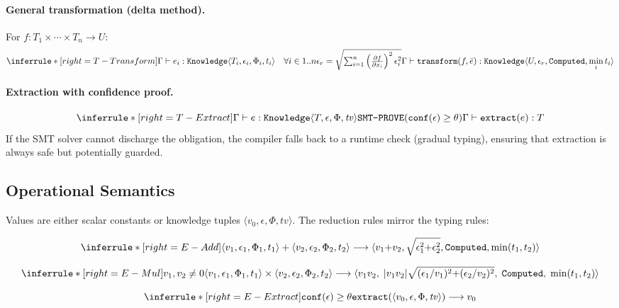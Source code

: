 \documentclass[acmsmall,screen,review,anonymous]{acmart}
\newcommand{\knowfull}[4]{\texttt{Knowledge}\langle #1, #2, #3, #4 \rangle}
\newcommand{\eps}{\epsilon}
\begin{document}
\paragraph{General transformation (delta method).}
For $f : T_1 \times \cdots \times T_n \to U$:
\[
\inferrule*[right=T-Transform]
  {\Gamma \vdash e_i : \knowfull{T_i}{\eps_i}{\Phi_i}{t_i}
   \quad \forall i \in 1..n \\\\
   \eps_r = \sqrt{\textstyle\sum_{i=1}^{n}
     \left(\frac{\partial f}{\partial x_i}\right)^2 \eps_i^2}}
  {\Gamma \vdash \texttt{transform}(f, \bar{e}) :
   \knowfull{U}{\eps_r}{\texttt{Computed}}{\min_i t_i}}
\]

\paragraph{Extraction with confidence proof.}
\[
\inferrule*[right=T-Extract]
  {\Gamma \vdash e : \knowfull{T}{\eps}{\Phi}{\mathit{tv}} \\
   \texttt{SMT-PROVE}(\texttt{conf}(\eps) \geq \theta)}
  {\Gamma \vdash \texttt{extract}(e) : T}
\]
If the SMT solver cannot discharge the obligation, the compiler falls
back to a runtime check (gradual typing), ensuring that extraction is
always safe but potentially guarded.

\subsection{Operational Semantics}

Values are either scalar constants or knowledge tuples
$\langle v_0, \eps, \Phi, \mathit{tv} \rangle$.
The reduction rules mirror the typing rules:

\[
\inferrule*[right=E-Add]
  { }
  {\langle v_1, \eps_1, \Phi_1, t_1 \rangle + \langle v_2, \eps_2, \Phi_2, t_2 \rangle
   \longrightarrow
   \langle v_1{+}v_2, \sqrt{\eps_1^2{+}\eps_2^2}, \texttt{Computed}, \min(t_1,t_2) \rangle}
\]

\[
\inferrule*[right=E-Mul]
  {v_1, v_2 \neq 0}
  {\langle v_1, \eps_1, \Phi_1, t_1 \rangle \times \langle v_2, \eps_2, \Phi_2, t_2 \rangle
   \longrightarrow \\
   \langle v_1 v_2,\;
   |v_1 v_2| \sqrt{(\eps_1/v_1)^2{+}(\eps_2/v_2)^2},\;
   \texttt{Computed},\;
   \min(t_1,t_2) \rangle}
\]

\[
\inferrule*[right=E-Extract]
  {\texttt{conf}(\eps) \geq \theta}
  {\texttt{extract}(\langle v_0, \eps, \Phi, \mathit{tv} \rangle)
   \longrightarrow v_0}
\]
\end{document}
